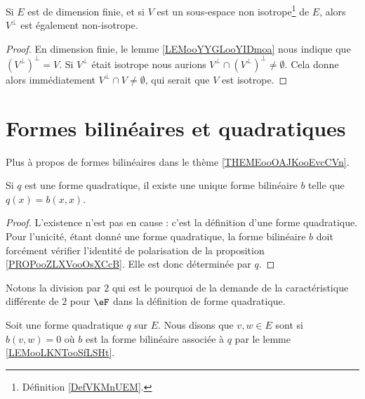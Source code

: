 \begin{lemma}	\label{LEMooOTVGooRAOyaD}
	Si \( E\) est de dimension finie, et si \( V\) est un sous-espace non isotrope\footnote{Définition \ref{DefVKMnUEM}.} de \( E\), alors \( V^{\perp}\) est également non-isotrope.
\end{lemma}

\begin{proof}
	En dimension finie, le lemme \ref{LEMooYYGLooYIDmoa} nous indique que \( (V^{\perp})^{\perp}=V\). Si \( V^{\perp}\) était isotrope nous aurions \( V^{\perp}\cap (V^{\perp})^{\perp}\neq \emptyset\). Cela donne alors immédiatement \( V^{\perp}\cap V\neq \emptyset\), qui serait que \( V\) est isotrope.
\end{proof}

\section{Formes bilinéaires et quadratiques}

Plus à propos de formes bilinéaires dans le thème \ref{THEMEooOAJKooEvcCVn}.


\begin{lemma}       \label{LEMooLKNTooSfLSHt}
	Si \( q\) est une forme quadratique, il existe une unique forme bilinéaire \( b\) telle que \( q(x)=b(x,x)\).
\end{lemma}

\begin{proof}
	L'existence n'est pas en cause : c'est la définition d'une forme quadratique. Pour l'unicité, étant donné une forme quadratique, la forme bilinéaire \( b\) doit forcément vérifier l'identité de polarisation de la proposition \ref{PROPooZLXVooOsXCcB}. Elle est donc déterminée par \( q\).
\end{proof}
Notons la division par \( 2\) qui est le pourquoi de la demande de la caractéristique différente de \( 2\) pour \( \eF\) dans la définition de forme quadratique.

\begin{definition}      \label{DEFooGECOooCCGVXG}
	Soit une forme quadratique \( q\) sur \( E\). Nous disons que \( v,w\in E\) sont  si
	\( b(v,w)=0\) où \( b\) est la forme bilinéaire associée à \( q\) par le lemme \ref{LEMooLKNTooSfLSHt}.
\end{definition}

